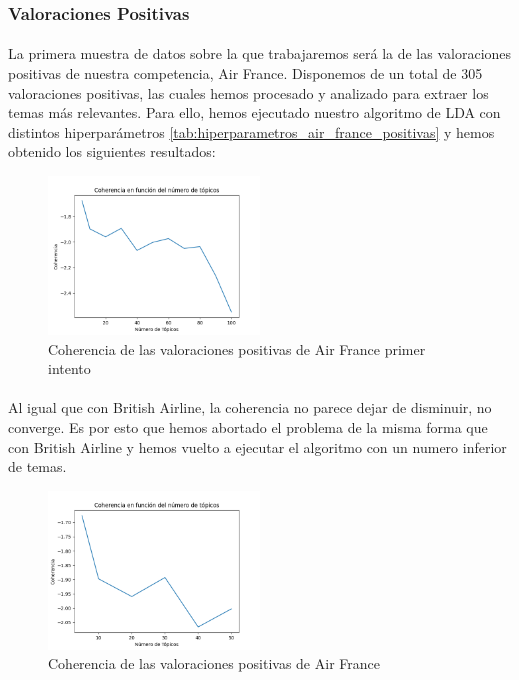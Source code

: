 \documentclass{report}
\begin{document}
                \subsubsection*{Valoraciones Positivas}
                    \paragraph*{}{
                        La primera muestra de datos sobre la que trabajaremos será la de las valoraciones positivas de nuestra competencia, Air France.
                        Disponemos de un total de 305 valoraciones positivas, las cuales hemos procesado y analizado para extraer los temas más relevantes.
                        Para ello, hemos ejecutado nuestro algoritmo de LDA con distintos hiperparámetros \ref{tab:hiperparametros_air_france_positivas} y hemos obtenido los siguientes resultados:
                    }
                    \begin{figure}[H]
                        \centering
                        \includegraphics[width=0.5\textwidth]{./img/air_france_positivas1.png}
                        \caption{Coherencia de las valoraciones positivas de Air France primer intento}
                    \end{figure}
                    \paragraph*{}{
                        Al igual que con British Airline, la coherencia no parece dejar de disminuir, no converge.
                        Es por esto que hemos abortado el problema de la misma forma que con British Airline y hemos vuelto a ejecutar el algoritmo con un numero inferior de temas.
                    }
                    \begin{figure}[H]
                        \centering
                        \includegraphics[width=0.5\textwidth]{./img/air_france_positivas2.png}
                        \caption{Coherencia de las valoraciones positivas de Air France}
                    \end{figure}
\end{document}
